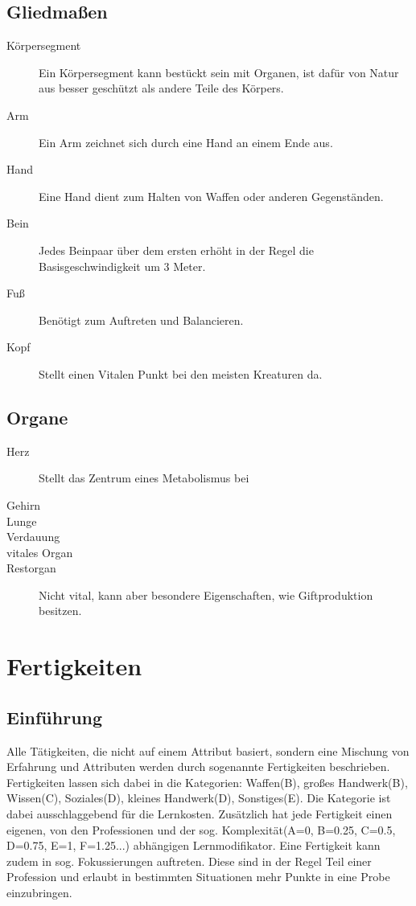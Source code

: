 \documentclass[a4paper,12pt,oneside]{book}
\begin{document}
\section{Gliedmaßen}
\begin{description}
\item[Körpersegment]Ein Körpersegment kann bestückt sein mit Organen, ist dafür von Natur aus besser geschützt als andere Teile des Körpers.
\item[Arm]Ein Arm zeichnet sich durch eine Hand an einem Ende aus.
\item[Hand]Eine Hand dient zum Halten von Waffen oder anderen Gegenständen.
\item[Bein]Jedes Beinpaar über dem ersten erhöht  in der Regel die Basisgeschwindigkeit um 3 Meter.
\item[Fuß]Benötigt zum Auftreten und Balancieren.
\item[Kopf]Stellt einen Vitalen Punkt bei den meisten Kreaturen da.
\end{description}
\section{Organe}
\begin{description}
\item[Herz]Stellt das Zentrum eines Metabolismus bei
\item[Gehirn]
\item[Lunge]
\item[Verdauung]
\item[vitales Organ]
\item[Restorgan]Nicht vital, kann aber besondere Eigenschaften, wie Giftproduktion besitzen.
\end{description}


\chapter{Fertigkeiten}
\section{Einführung}
Alle Tätigkeiten, die nicht auf einem Attribut basiert, sondern eine Mischung von Erfahrung und Attributen werden durch sogenannte Fertigkeiten beschrieben. Fertigkeiten lassen sich dabei in die Kategorien: Waffen(B), großes Handwerk(B), Wissen(C), Soziales(D), kleines Handwerk(D), Sonstiges(E). Die Kategorie ist dabei ausschlaggebend für die Lernkosten. Zusätzlich hat jede Fertigkeit einen eigenen, von den Professionen und der sog. Komplexität(A=0, B=0.25, C=0.5, D=0.75, E=1, F=1.25...) abhängigen Lernmodifikator. Eine Fertigkeit kann zudem in sog. Fokussierungen auftreten. Diese sind in der Regel Teil einer Profession und erlaubt in bestimmten Situationen mehr Punkte in eine Probe einzubringen.
\end{document}
